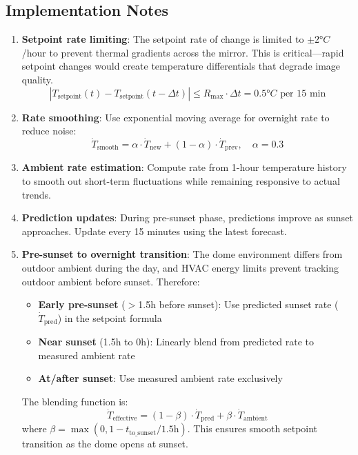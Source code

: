 \documentclass[11pt,letterpaper]{article}
\begin{document}
\subsection{Implementation Notes}

\begin{enumerate}
    \item \textbf{Setpoint rate limiting}: The setpoint rate of change is limited to $\pm 2°C$/hour to prevent thermal gradients across the mirror. This is critical---rapid setpoint changes would create temperature differentials that degrade image quality.
    \begin{equation}
        |T_\text{setpoint}(t) - T_\text{setpoint}(t-\Delta t)| \leq R_\text{max} \cdot \Delta t = 0.5°C \text{ per 15 min}
    \end{equation}

    \item \textbf{Rate smoothing}: Use exponential moving average for overnight rate to reduce noise:
    \begin{equation}
        \dot{T}_\text{smooth} = \alpha \cdot \dot{T}_\text{new} + (1-\alpha) \cdot \dot{T}_\text{prev}, \quad \alpha = 0.3
    \end{equation}

    \item \textbf{Ambient rate estimation}: Compute rate from 1-hour temperature history to smooth out short-term fluctuations while remaining responsive to actual trends.

    \item \textbf{Prediction updates}: During pre-sunset phase, predictions improve as sunset approaches. Update every 15 minutes using the latest forecast.

    \item \textbf{Pre-sunset to overnight transition}: The dome environment differs from outdoor ambient during the day, and HVAC energy limits prevent tracking outdoor ambient before sunset. Therefore:
    \begin{itemize}
        \item \textbf{Early pre-sunset} ($>$1.5h before sunset): Use predicted sunset rate ($\dot{T}_\text{pred}$) in the setpoint formula
        \item \textbf{Near sunset} (1.5h to 0h): Linearly blend from predicted rate to measured ambient rate
        \item \textbf{At/after sunset}: Use measured ambient rate exclusively
    \end{itemize}
    The blending function is:
    \begin{equation}
        \dot{T}_\text{effective} = (1-\beta) \cdot \dot{T}_\text{pred} + \beta \cdot \dot{T}_\text{ambient}
    \end{equation}
    where $\beta = \max(0, 1 - t_\text{to\_sunset}/1.5\text{h})$. This ensures smooth setpoint transition as the dome opens at sunset.
\end{enumerate}
\end{document}
